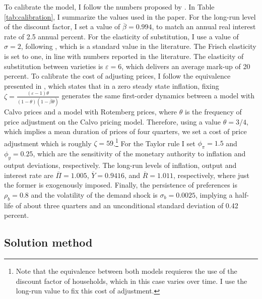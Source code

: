 \documentclass[12pt]{article}
\numberwithin{equation}{section}
\begin{document}
To calibrate the model, I follow the numbers proposed by \cite{Fernandez-VillaverdeEtAl2015}. In Table \ref{tab:calibration}, I summarize the values used in the paper. For the long-run level of the discount factor, I set a value of $\overline{\beta}=0.994$, to match an annual real interest rate of 2.5 annual percent. For the elasticity of substitution, I use a value of $\sigma=2$, following \cite{Gali2015}, which is a standard value in the literature. The Frisch elasticity is set to one, in line with numbers reported in the literature. The elasticity of substitution between varieties is $\varepsilon=6$, which delivers an average mark-up of 20 percent. To calibrate the cost of adjusting prices, I follow the equivalence presented in \cite{AscariEtAl2012}, which states that in a zero steady state inflation, fixing $\zeta=\frac{(\varepsilon-1)\theta}{(1-\theta)(1-\overline{\beta}\theta)}$ generates the same first-order dynamics between a model with Calvo prices and a model with Rotemberg prices, where $\theta$ is the frequency of price adjustment on the Calvo pricing model. Therefore, using a value $\theta=3/4$, which implies a mean duration of prices of four quarters, we set a cost of price adjustment which is roughly $\zeta=59$.\footnote{Note that the equivalence between both models requieres the use of the discount factor of households, which in this case varies over time. I use the long-run value to fix this cost of adjustment.} For the Taylor rule I set $\phi_{\pi}=1.5$ and $\phi_{y}=0.25$, which are the sensitivity of the monetary authority to inflation and output deviations, respectively. The long-run levels of inflation, output and interest rate are $\overline\Pi=1.005$, $\overline Y=0.9416$, and $\overline R=1.011$, respectively, where just the former is exogenously imposed. Finally, the persistence of preferences is $\rho_b=0.8$ and the volatility of the demand shock is $\sigma_b=0.0025$, implying a half-life of about three quarters and an unconditional standard deviation of 0.42 percent. 



\subsection{Solution method}
\end{document}
